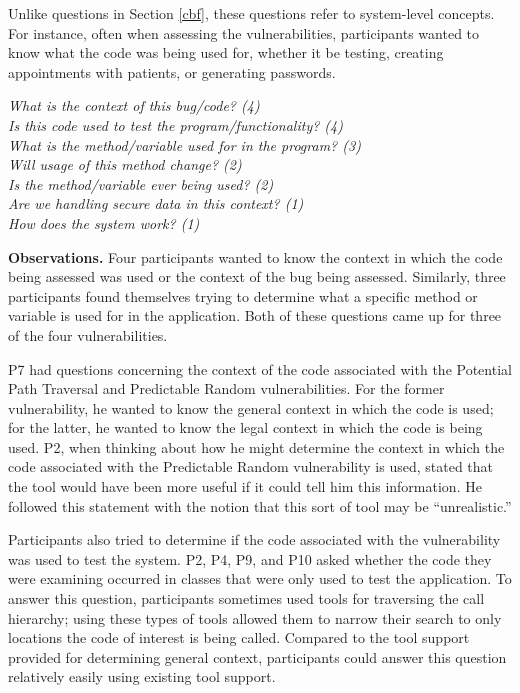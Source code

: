 \documentclass{acm_proc_article-sp}
\begin{document}
Unlike questions in Section \ref{cbf}, these questions refer to system-level concepts.
For instance, often when assessing the vulnerabilities, participants wanted to know what the code was being used for, whether it be testing, creating appointments with patients, or generating passwords.


\noindent\emph{What is the context of this bug/code? (4)} \\
\emph{Is this code used to test the program/functionality? (4)} \\
\emph{What is the method/variable used for in the program? (3)} \\
\emph{Will usage of this method change? (2)} \\
\emph{Is the method/variable ever being used? (2)} \\
\emph{Are we handling secure data in this context? (1)} \\
\emph{How does the system work? (1)} 


\noindent\textbf{Observations.}
Four participants wanted to know the context in which the code being assessed was used or the context of the bug being assessed.
Similarly, three participants found themselves trying to determine what a specific method or variable is used for in the application.
Both of these questions came up for three of the four vulnerabilities.


P7 had questions concerning the context of the code associated with the Potential Path Traversal and Predictable Random vulnerabilities.
For the former vulnerability, he wanted to know the general context in which the code is used; for the latter, he wanted to know the legal context in which the code is being used.
P2, when thinking about how he might determine the context in which the code associated with the Predictable Random vulnerability is used, stated that the tool would have been more useful if it could tell him this information.
He followed this statement with the notion that this sort of tool may be ``unrealistic.'' 

Participants also tried to determine if the code associated with the vulnerability was used to test the system. 
P2, P4, P9, and P10 asked whether the code they were examining occurred in classes that were only used to test the application. 
To answer this question, participants sometimes used tools for traversing the call hierarchy; using these types of tools allowed them to narrow their search to only locations the code of interest is being called.
Compared to the tool support provided for determining general context, participants could answer this question relatively easily using existing tool support.
\end{document}
